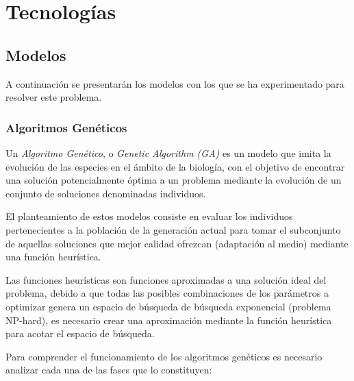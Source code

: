 
\chapter{Tecnologías}
\label{tecnologias}

    \section{Modelos}

        A continuación se presentarán los modelos con los que se ha experimentado para resolver este problema. 

        \subsection {Algoritmos Genéticos}
            Un \textit{Algoritmo Genético}, o \textit{Genetic Algorithm (GA)} es un modelo que imita la evolución de las especies en el ámbito de la biología, con el objetivo de encontrar una solución potencialmente óptima a un problema mediante la evolución de un conjunto de soluciones denominadas individuos.

            El planteamiento de estos modelos consiste en evaluar los individuos pertenecientes a la población de la generación actual para tomar el subconjunto de aquellas soluciones que mejor calidad ofrezcan (adaptación al medio) mediante una función heurística.

            Las funciones heurísticas son funciones aproximadas a una solución ideal del problema, debido a que todas las posibles combinaciones de los parámetros a optimizar genera un espacio de búsqueda de búsqueda exponencial (problema NP-hard), es necesario crear una aproximación mediante la función heurística para acotar el espacio de búsqueda.

            Para comprender el funcionamiento de los algoritmos genéticos es necesario analizar cada una de las fases que lo constituyen:
            
